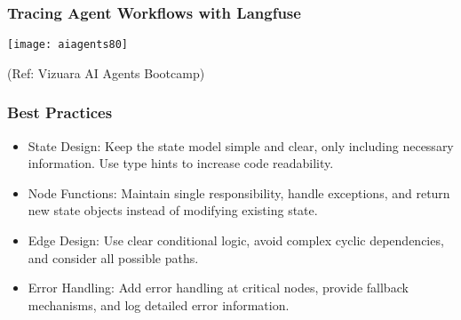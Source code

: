 \begin{frame}[fragile]\frametitle{Tracing Agent Workflows with Langfuse}

        \begin{center}

        \texttt{[image: aiagents80]}
		
		{\tiny (Ref: Vizuara AI Agents Bootcamp)}
				
        \end{center}    

\end{frame}


\begin{frame}[fragile]\frametitle{Best Practices}

      \begin{itemize}
        \item State Design: Keep the state model simple and clear, only including necessary information. Use type hints to increase code readability.
        \item Node Functions: Maintain single responsibility, handle exceptions, and return new state objects instead of modifying existing state.
        \item Edge Design: Use clear conditional logic, avoid complex cyclic dependencies, and consider all possible paths.
        \item Error Handling: Add error handling at critical nodes, provide fallback mechanisms, and log detailed error information.
      \end{itemize}
\end{frame}
